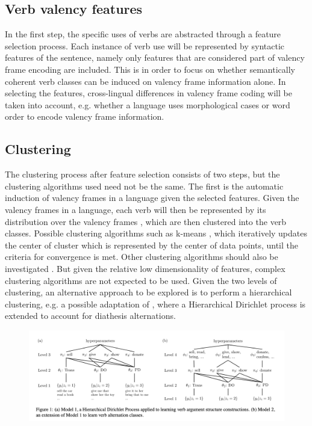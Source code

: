 \subsection{Verb valency features}\label{subsec:features}

In the first step, the specific uses of verbs are abstracted through a feature selection process. Each instance of verb use will be represented by syntactic features of the sentence, namely only features that are considered part of valency frame encoding are included. This is in order to focus on whether semantically coherent verb classes can be induced on valency frame information alone. In selecting the features, cross-lingual differences in valency frame coding will be taken into account, e.g. whether a language uses morphological cases or word order to encode valency frame information.  


\subsection{Clustering}\label{subsec:clustering}

The clustering process after feature selection consists of two steps, but the clustering algorithms used need not be the same. The first is the automatic induction of valency frames in a language given the selected features. Given the valency frames in a language, each verb will then be represented by its distribution over the valency frames , which are then clustered into the verb classes.
Possible clustering algorithms such as k-means \citep{macqueen1967}, which iteratively updates the center of cluster which is represented by the center of data points, until the criteria for convergence is met. Other clustering algorithms should also be investigated \citep{xu2015a}. But given the relative low dimensionality of features, complex clustering algorithms are not expected to be used. Given the two levels of clustering, an alternative approach to be explored is to perform a hierarchical clustering, e.g. a possible adaptation of \citet{parisien2010}, where a Hierarchical Dirichlet process is extended to account for diathesis alternations. 



\begin{figure}
    \includegraphics[width=\textwidth]{figures/verb_alternation_classes.png}
    \centering
\end{figure}



